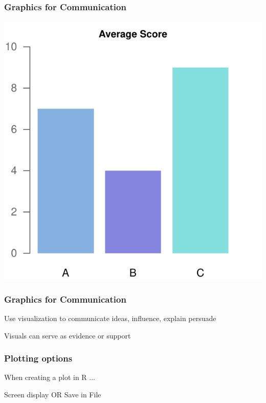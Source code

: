 \documentclass[12pt]{beamer}\usepackage[]{graphicx}\usepackage[]{color}
\newenvironment{knitrout}{}{} %
\begin{document}

\begin{frame}
\frametitle{Graphics for Communication}

\begin{knitrout}
\color{fgcolor}

{\centering \includegraphics[width=.7\linewidth,height=.6\linewidth]{figure/unnamed-chunk-2-1} 

}



\end{knitrout}

\end{frame}


\begin{frame}
\frametitle{Graphics for Communication}

Use visualization to communicate ideas, influence, explain persuade

\bigskip
Visuals can serve as evidence or support

\end{frame}


\begin{frame}
\begin{center}
\Huge{}
\end{center}
\end{frame}


\begin{frame}
\frametitle{Plotting options}

\centerline{\Large \mdlit When creating a plot in R ...}

\vspace{18pt}

\centerline{\Large Screen display \quad OR \quad Save in File}

\end{frame}
\end{document}
